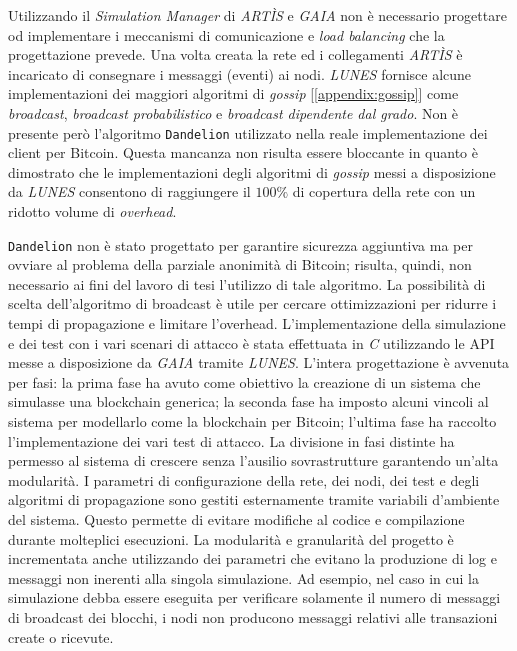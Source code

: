 Utilizzando il \textit{Simulation Manager} di \textit{ARTÌS} e \textit{GAIA} non è necessario progettare od implementare i meccanismi di comunicazione e \textit{load balancing} che la progettazione prevede. Una volta creata la rete ed i collegamenti \textit{ARTÌS} è incaricato di consegnare i messaggi (eventi) ai nodi.\newline
\textit{LUNES} fornisce alcune implementazioni dei maggiori algoritmi di \textit{gossip} [\ref{appendix:gossip}] come \textit{broadcast}, \textit{broadcast probabilistico} e \textit{broadcast dipendente dal grado}. Non è presente però l'algoritmo \texttt{Dandelion} utilizzato nella reale implementazione dei client per Bitcoin. Questa mancanza non risulta essere bloccante in quanto è dimostrato\cite{gdalunes} che le implementazioni degli algoritmi di \textit{gossip} messi a disposizione da \textit{LUNES} consentono di raggiungere il $100\%$ di copertura della rete con un ridotto volume di \textit{overhead}.

\texttt{Dandelion} non è stato progettato per garantire sicurezza aggiuntiva ma per ovviare al problema della parziale anonimità di Bitcoin; risulta, quindi, non necessario ai fini del lavoro di tesi l'utilizzo di tale algoritmo.
La possibilità di scelta dell'algoritmo di broadcast è utile per cercare ottimizzazioni per ridurre i tempi di propagazione e limitare l'overhead.\newline\newline
L'implementazione della simulazione e dei test con i vari scenari di attacco è stata effettuata in \textit{C} utilizzando le API messe a disposizione da \textit{GAIA} tramite \textit{LUNES}.\newline
L'intera progettazione è avvenuta per fasi: la prima fase ha avuto come obiettivo la creazione di un sistema che simulasse una blockchain generica; la seconda fase ha imposto alcuni vincoli al sistema per modellarlo come la blockchain per Bitcoin; l'ultima fase ha raccolto l'implementazione dei vari test di attacco.\newline
La divisione in fasi distinte ha permesso al sistema di crescere senza l'ausilio sovrastrutture garantendo un'alta modularità.\newline
I parametri di configurazione della rete, dei nodi, dei test e degli algoritmi di propagazione sono gestiti esternamente tramite variabili d'ambiente del sistema. Questo permette di evitare modifiche al codice e compilazione durante molteplici esecuzioni. La modularità e granularità del progetto è incrementata anche utilizzando dei parametri che evitano la produzione di log e messaggi non inerenti alla singola simulazione. Ad esempio, nel caso in cui la simulazione debba essere eseguita per verificare solamente il numero di messaggi di broadcast dei blocchi, i nodi non producono messaggi relativi alle transazioni create o ricevute.\newline

